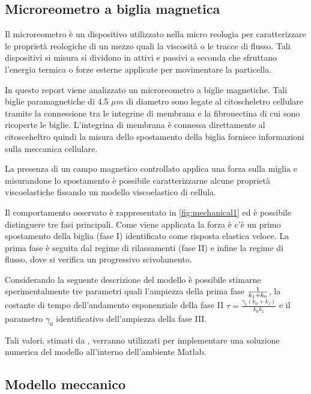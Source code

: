 \subsection{Microreometro a biglia magnetica}

Il microreometro è un dispositivo utilizzato nella micro reologia per caratterizzare le proprietà reologiche di un mezzo quali la viscosità o le tracce di flusso. Tali dispositivi si misura si dividono in attivi e passivi a seconda che sfruttano l'energia termica o forze esterne applicate per movimentare la particella.

In questo report viene analizzato un microreometro a biglie magnetiche. Tali biglie paramagnetiche di 4.5 $\mu m$ di diametro sono legate al citoscheletro cellulare tramite la connessione tra le integrine di membrana e la fibronectina di cui sono ricoperte le biglie. L'integrina di membrana è connessa direttamente al citosceheltro quindi la misura dello spostamento della biglia fornisce informazioni sulla meccanica cellulare.

La presenza di un campo magnetico controllato applica una forza sulla miglia e misurandone lo spostamento è possibile caratterizzarne alcune proprietà viscoelastiche \cite{bausch_local_1998} fissando un modello viscoelastico di cellula.

Il comportamento osservato è rappresentato in \cref{fig:mechanical1} ed è possibile distinguere tre fasi principali. Come viene applicata la forza è c'è un primo spostamento della biglia (fase I) identificato come risposta elastica veloce. La prima fase è seguita dal regime di rilassamenti (fase II) e infine la regime di flusso, dove si verifica un progressivo scivolamento.

Considerando la seguente descrizione del modello è possibile stimarne sperimentalmente tre parametri quali l'ampiezza della prima fase $1\over k_1+k_0$, la costante di tempo dell'andamento esponenziale della fase II $\tau=\frac{\gamma_{1}\left(k_{0}+k_{1}\right)}{k_{0} k_{1}}$ e il parametro $\gamma_0$ identificativo dell'ampiezza della fase III. 

Tali valori, stimati da \cite{bausch_local_1998}, verranno utilizzati per implementare una soluzione numerica del modello all'interno dell'ambiente Matlab.



\subsection{Modello meccanico}

